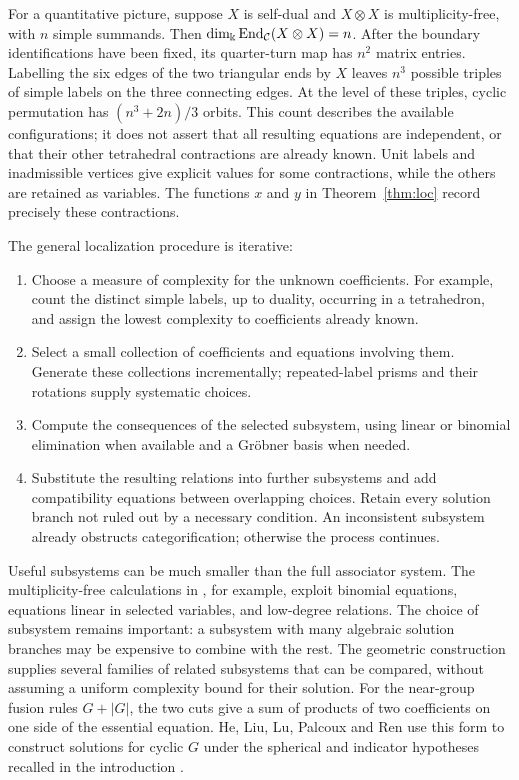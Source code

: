 \documentclass{amsart}
\begin{document}
For a quantitative picture, suppose $X$ is self-dual and $X\otimes X$ is
multiplicity-free, with $n$ simple summands. Then
$\dim_{\Bbbk}\mathrm{End}_{\mathcal{C}}(X\otimes X)=n$. After the boundary identifications have
been fixed, its quarter-turn map has $n^2$ matrix entries. Labelling the six edges of the two triangular ends by $X$ leaves $n^3$ possible triples of simple labels on the three connecting edges. At the level of these triples, cyclic permutation has
$(n^3+2n)/3$ orbits. This count describes the available configurations;
it does not assert that all resulting equations are independent, or that
their other tetrahedral contractions are already known. Unit labels and
inadmissible vertices give explicit values for some contractions, while the
others are retained as variables. The functions $x$ and $y$ in
Theorem~\ref{thm:loc} record precisely these contractions.

The general localization procedure is iterative:
\begin{enumerate}
\item Choose a measure of complexity for the unknown coefficients. For
example, count the distinct simple labels, up to duality, occurring in a
tetrahedron, and assign the lowest complexity to coefficients already known.
\item Select a small collection of coefficients and equations involving
them. Generate these collections incrementally; repeated-label prisms and
their rotations supply systematic choices.
\item Compute the consequences of the selected subsystem, using linear or
binomial elimination when available and a Gr\"obner basis when needed.
\item Substitute the resulting relations into further subsystems and add
compatibility equations between overlapping choices. Retain every solution
branch not ruled out by a necessary condition. An inconsistent subsystem
already obstructs categorification; otherwise the process continues.
\end{enumerate}
Useful subsystems can be much smaller than the full associator system. The
multiplicity-free calculations in \cite{gvfuscat}, for example, exploit
binomial equations, equations linear in selected variables, and low-degree
relations. The choice of subsystem remains important: a subsystem with many
algebraic solution branches may be expensive to combine with the rest.
The geometric construction supplies several families of related subsystems
that can be compared, without assuming a uniform complexity bound for their
solution. For the near-group fusion rules $G+|G|$, the two cuts give a sum of products of two coefficients on one side of the essential equation. He, Liu, Lu, Palcoux and Ren use this form to construct solutions for cyclic $G$ under the spherical and indicator hypotheses recalled in the introduction \cite[\S2]{LLPRnear}.
\end{document}
